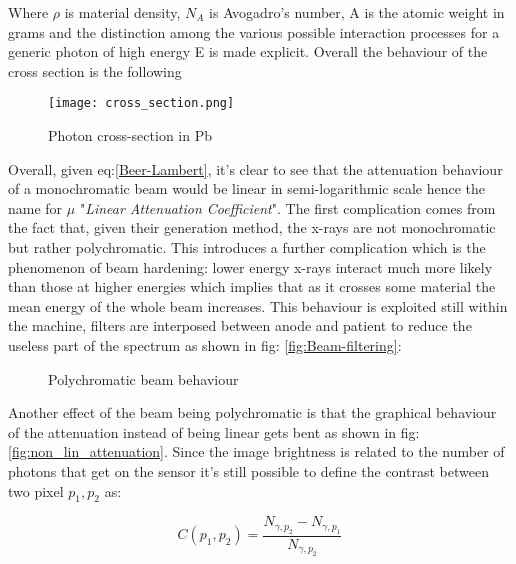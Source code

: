 Where $\rho$ is material density, $N_A$ is Avogadro's number, A is the atomic weight in grams and the distinction among the various possible interaction processes for a generic photon of high energy E is made explicit. Overall the behaviour of the cross section is the following

\begin{figure}[H]
\centering
  		\texttt{[image: cross\_section.png]}
        \caption{Photon cross-section in Pb\label{fig:Photon-Cross-sect}}
\end{figure}

Overall, given eq:\ref{Beer-Lambert}, it's clear to see that the attenuation behaviour of a monochromatic beam would be linear in semi-logarithmic scale hence the name for $\mu$ "\textit{Linear Attenuation Coefficient}". The first complication comes from the fact that, given their generation method, the x-rays are not monochromatic but rather polychromatic. This introduces a further complication which is the phenomenon of beam hardening: lower energy x-rays interact much more likely than those at higher energies which implies that as it crosses some material the mean energy of the whole beam increases. This behaviour is exploited still within the machine, filters are interposed between anode and patient to reduce the useless part of the spectrum as shown in fig: \ref{fig:Beam-filtering}:

\begin{figure}[H]
\centering
        \caption{Polychromatic beam behaviour}\label{fig:polychrom_behaviour}
\end{figure}

Another effect of the beam being polychromatic is that the graphical behaviour of the attenuation instead of being linear gets bent as shown in fig: \ref{fig:non_lin_attenuation}. Since the image brightness is related to the number of photons that get on the sensor it's still possible to define the contrast between two pixel $p_1, p_2$ as:

\begin{equation}
C(p_1,p_2) = \frac{N_{\gamma ,p_2}-N_{\gamma ,p_1}}{N_{\gamma ,p_2}}
\end{equation}

